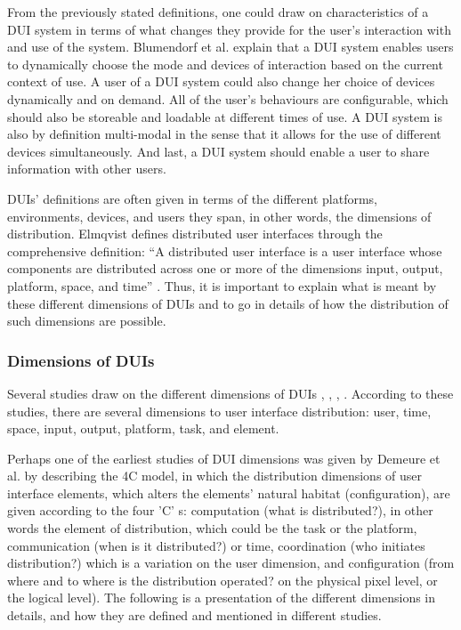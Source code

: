 From the previously stated definitions, one could draw on characteristics of a
DUI system in terms of what changes they provide for the user's interaction with
and use of the system. Blumendorf et al. \cite{blumendorf2011distributed}
explain that a DUI system enables users to dynamically choose the mode and
devices of interaction based on the current context of use. A user of a DUI
system could also change her choice of devices dynamically and on demand. All
of the user's behaviours are configurable, which should also be storeable and loadable at different times of
use. A DUI system is also by definition multi-modal in the sense that it allows
for the use of different devices simultaneously. And last, a DUI system
should enable a user to share information with other users.\par 
DUIs' definitions are often given in terms of the different platforms,
environments, devices, and users they span, in other words, the dimensions of
distribution. Elmqvist defines distributed user interfaces through the
comprehensive definition: ``A distributed user interface is a user interface whose components are distributed across one
or more of the dimensions input, output, platform, space, and time''
\cite{elmqvist2011distributed}. Thus, it is important to explain what is meant
by these different dimensions of DUIs and to go in details of how the
distribution of such dimensions are possible.

\subsubsection{Dimensions of DUIs}
Several studies draw on the different dimensions of DUIs
\cite{melchior2011distributed}, \cite{demeure20084c},
\cite{elmqvist2011distributed}, \cite{vanderdonckt2010distributed}. According to
these studies, there are several dimensions to user interface distribution:
user, time, space, input, output, platform, task, and element.\par 
Perhaps one of the earliest studies of DUI dimensions was
given by Demeure et al. by describing the 4C model, in
which the distribution dimensions of user interface elements, which alters the
elements' natural habitat (configuration), are given according to the four 'C'
s: computation (what is distributed?), in other words the element of
distribution, which could be the task or the platform, communication (when is it distributed?)
or time, coordination (who initiates distribution?) which is a variation on the
user dimension, and configuration (from where and to where is the distribution operated? on the physical pixel level, or
the logical level)\cite{demeure20084c}. The following is a presentation of the
different dimensions in details, and how they are defined and mentioned in different studies.
